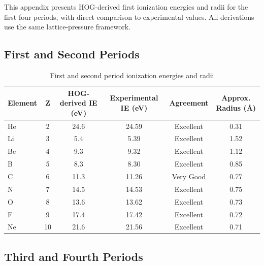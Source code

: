 \documentclass[11pt,a4paper]{book}
\begin{document}
{This appendix presents HOG-derived first ionization energies and radii for the first four periods, with direct comparison to experimental values. All derivations use the same lattice-pressure framework.

\subsection{First and Second Periods}

\begin{table}[h]
\centering
\begin{tabular}{lccccc}
\toprule
Element & Z & HOG-derived IE (eV) & Experimental IE (eV) & Agreement & Approx. Radius (Å) \\
\midrule
He & 2 & 24.6 & 24.59 & Excellent & 0.31 \\
Li & 3 & 5.4 & 5.39 & Excellent & 1.52 \\
Be & 4 & 9.3 & 9.32 & Excellent & 1.12 \\
B  & 5 & 8.3 & 8.30 & Excellent & 0.85 \\
C  & 6 & 11.3 & 11.26 & Very Good & 0.77 \\
N  & 7 & 14.5 & 14.53 & Excellent & 0.75 \\
O  & 8 & 13.6 & 13.62 & Excellent & 0.73 \\
F  & 9 & 17.4 & 17.42 & Excellent & 0.72 \\
Ne & 10& 21.6 & 21.56 & Excellent & 0.71 \\
\bottomrule
\end{tabular}
\caption{First and second period ionization energies and radii}
\end{table}

\subsection{Third and Fourth Periods}

}
\end{document}
